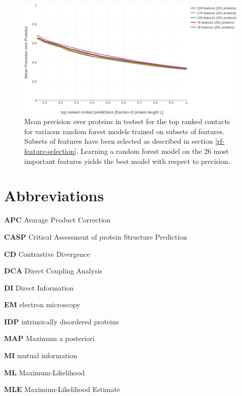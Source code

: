 \documentclass[12pt,a4paper,twoside]{book}
\theoremstyle{definition}
\theoremstyle{definition}
\theoremstyle{remark}
\begin{document}
\begin{figure}

{\centering \includegraphics[width=0.9\linewidth]{img/random_forest_contact_prior/precision_vs_rank_featureselection_plll2norm_random_forest_nestimators1000_maxfeaturesauto_26features_notitle} 

}

\caption{Mean precision over
proteins in testset for the top ranked contacts for variaous random
forest models trained on subsets of features. Subsets of features have
been selected as described in section \ref{rf-feature-selection}.
Learning a random forest model on the 26 most important features yields
the best model with respect to precision.}\label{fig:feature-selection-rf-with-pll-score}
\end{figure}

\appendix


\hypertarget{abbrev}{\chapter{Abbreviations}\label{abbrev}}

\textbf{APC} Avarage Product Correction

\textbf{CASP} Critical Assessment of protein Structure Prediction

\textbf{CD} Contrastive Divergence

\textbf{DCA} Direct Coupling Analysis

\textbf{DI} Direct Information

\textbf{EM} electron microscopy

\textbf{IDP} intrinsically disordered proteins

\textbf{MAP} Maximum a posteriori

\textbf{MI} mutual information

\textbf{ML} Maximum-Likelihood

\textbf{MLE} Maximum-Likelihood Estimate
\end{document}
